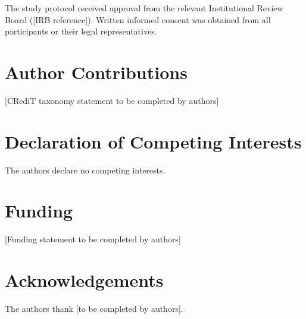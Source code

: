 \documentclass[preprint,12pt]{elsarticle}
\begin{document}
The study protocol received approval from the relevant Institutional Review Board ([IRB reference]). Written informed consent was obtained from all participants or their legal representatives.

\section*{Author Contributions}

[CRediT taxonomy statement to be completed by authors]

\section*{Declaration of Competing Interests}

The authors declare no competing interests.

\section*{Funding}

[Funding statement to be completed by authors]

\section*{Acknowledgements}

The authors thank [to be completed by authors].

 

\end{document}
